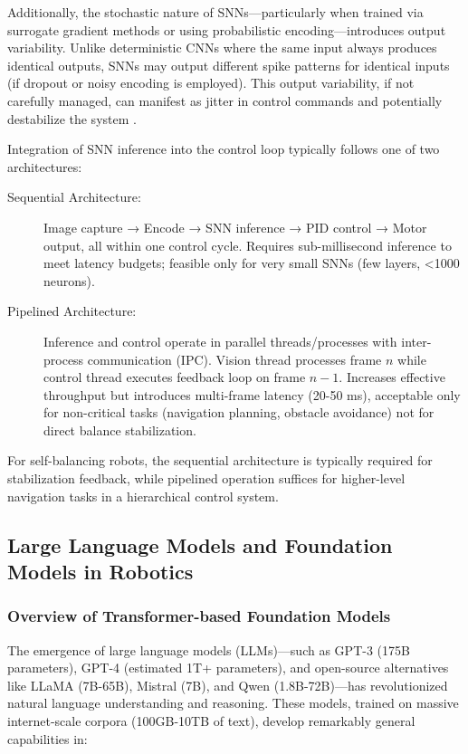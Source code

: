 Additionally, the stochastic nature of SNNs—particularly when trained via surrogate gradient methods or using 
probabilistic encoding—introduces output variability. Unlike deterministic CNNs where the same input always produces 
identical outputs, SNNs may output different spike patterns for identical inputs (if dropout or noisy encoding is 
employed). This output variability, if not carefully managed, can manifest as jitter in control commands and 
potentially destabilize the system \cite{tan2021neuromorphic}.

Integration of SNN inference into the control loop typically follows one of two architectures:

\begin{description}
    \item[Sequential Architecture:] Image capture → Encode → SNN inference → PID control → Motor output, all 
    within one control cycle. Requires sub-millisecond inference to meet latency budgets; feasible only for 
    very small SNNs (few layers, <1000 neurons).
    
    \item[Pipelined Architecture:] Inference and control operate in parallel threads/processes with inter-process 
    communication (IPC). Vision thread processes frame $n$ while control thread executes feedback loop on frame 
    $n-1$. Increases effective throughput but introduces multi-frame latency (20-50 ms), acceptable only for 
    non-critical tasks (navigation planning, obstacle avoidance) not for direct balance stabilization.
\end{description}

For self-balancing robots, the sequential architecture is typically required for stabilization feedback, while 
pipelined operation suffices for higher-level navigation tasks in a hierarchical control system.


\subsection{Large Language Models and Foundation Models in Robotics}

\subsubsection{Overview of Transformer-based Foundation Models}

The emergence of large language models (LLMs)—such as GPT-3 (175B parameters), GPT-4 (estimated 1T+ parameters), 
and open-source alternatives like LLaMA (7B-65B), Mistral (7B), and Qwen (1.8B-72B)—has revolutionized natural 
language understanding and reasoning. These models, trained on massive internet-scale corpora (100GB-10TB of text), 
develop remarkably general capabilities in:

